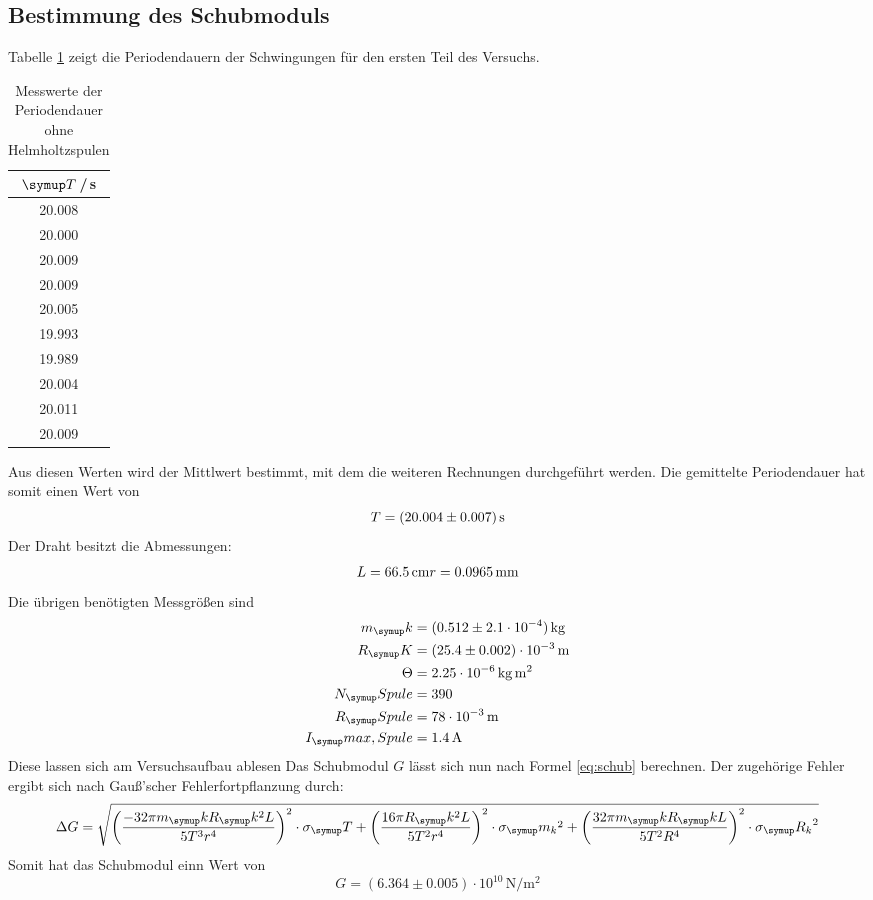 \subsection{Bestimmung des Schubmoduls}
Tabelle \ref{tab:data1} zeigt die Periodendauern der Schwingungen für den ersten
Teil des Versuchs.
\begin{table}
  \centering
  \begin{tabular}{c}
    \toprule
    $\su{T}$\,/\,s \\
    \midrule
    20.008 \\
    20.000 \\
    20.009 \\
    20.009 \\
    20.005 \\
    19.993 \\
    19.989 \\
    20.004 \\
    20.011 \\
    20.009 \\
    \bottomrule
  \end{tabular}
  \caption{Messwerte der Periodendauer ohne Helmholtzspulen}
  \label{tab:data1}
\end{table}
Aus diesen Werten wird der Mittlwert bestimmt, mit dem die weiteren Rechnungen
durchgeführt werden. Die gemittelte Periodendauer hat somit einen Wert von
\begin{equation*}
  T = (20.004 \pm 0.007)\,\si{\second}
\end{equation*}
Der Draht besitzt die Abmessungen:
\begin{align*}
  L = 66.5 \,\si{\centi\meter}
  r = 0.0965 \,\si{\milli\meter}
\end{align*}
Die übrigen benötigten Messgrößen sind
\begin{align*}
  m_\su{k} &= (0.512 \pm 2.1\cdot10^{-4})\kg \\
  R_\su{K} &= (25.4 \pm 0.002)\cdot10^{-3}\mt\\
  \Theta   &=  2.25\cdot10^{-6}\,\si{\kilo\gram\square\meter}\\
  N_\su{Spule} &= 390\\
  R_\su{Spule} &= 78\cdot10^{-3}\mt\\
  I_\su{max,Spule} &= 1.4\Amp
\end{align*}
Diese lassen sich am Versuchsaufbau ablesen %
Das Schubmodul $G$ lässt sich nun nach Formel \eqref{eq:schub} berechnen. Der
zugehörige Fehler ergibt sich nach Gauß'scher Fehlerfortpflanzung durch:
\begin{equation*}
  \Delta G = \sqrt{\left(\frac{-32\pi m_\su{k} R_\su{k}^2 L}{5T^3 r^4}\right)^2
  \cdot\sigma_\su{T} + \left(\frac{16\pi R_\su{k}^2L}{5T^2r^4}\right)^2\cdot
  \sigma_\su{m_k}^2+\left(\frac{32\pi m_\su{k}R_\su{k}L}{5T^2R^4}\right)^2\cdot
  \sigma_\su{R_k}^2}
\end{equation*}
Somit hat das Schubmodul einn Wert von
\begin{equation*}
  G = (6.364 \pm 0.005)\cdot10^{10}\,\si{\newton\per\square\meter}
\end{equation*}

